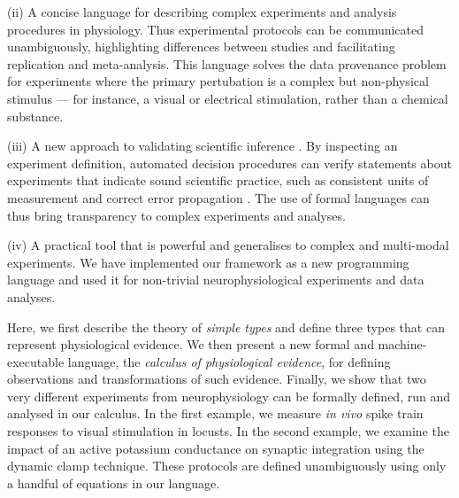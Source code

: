 (ii) A concise language for describing complex experiments and
analysis procedures in physiology. Thus experimental protocols can be
communicated unambiguously, highlighting differences between studies
and facilitating replication and meta-analysis. This language solves
the data provenance problem \citep{Pool2002} for experiments where the
primary pertubation is a complex but non-physical stimulus --- for
instance, a visual or electrical stimulation, rather than a chemical
substance.

(iii) A new approach to validating scientific inference
\citep{Editors2003, Editors2010, DeSchutter2010}. By inspecting an
experiment definition, automated decision procedures can verify
statements about experiments that indicate sound scientific practice,
such as consistent units of measurement \citep{Kennedy1997} and
correct error propagation \citep{Taylor1997}. The use of formal
languages can thus bring transparency to complex experiments and
analyses.

(iv) A practical tool that is powerful and generalises to complex and
multi-modal experiments. We have implemented our framework as a new
programming language and used it for non-trivial neurophysiological
experiments and data analyses.

Here, we first describe the theory of \emph{simple types}
\citep{Pierce2002} and define three types that can represent
physiological evidence. We then present a new formal and
machine-executable language, the \emph{calculus of physiological
  evidence}, for defining observations and transformations of such
evidence. Finally, we show that two very different experiments from
neurophysiology can be formally defined, run and analysed in our
calculus. In the first example, we measure \emph{in vivo} spike train
responses to visual stimulation in locusts. In the second example, we
examine the impact of an active potassium conductance on synaptic
integration using the dynamic clamp technique. These protocols are
defined unambiguously using only a handful of equations in our
language.

